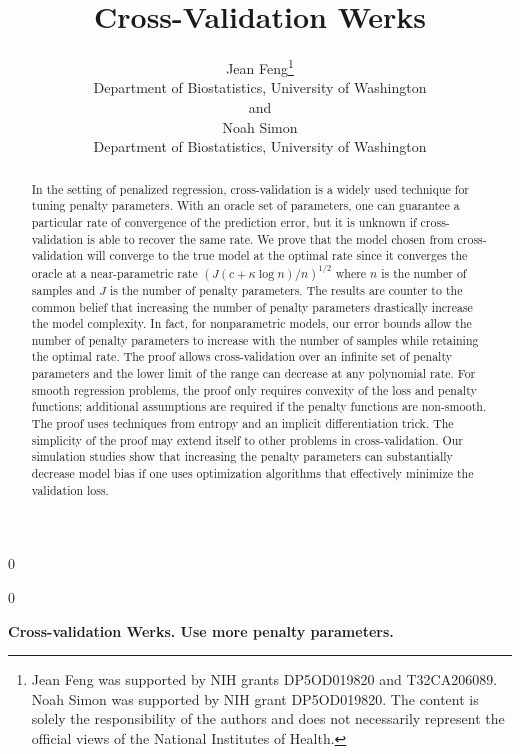 \documentclass[12pt]{article}
\newcommand{\blind}{0}
\begin{document}
%

\def\spacingset#1{\renewcommand{\baselinestretch}%
{#1}\small\normalsize} \spacingset{1}



\blind
{
  \title{\bf Cross-Validation Werks}
  \author{Jean Feng\thanks{
    Jean Feng was supported by NIH grants DP5OD019820 and T32CA206089.
    Noah Simon was supported by NIH grant DP5OD019820.
    The content is solely the responsibility of the authors and does not necessarily represent the official views of the National Institutes of Health.}\\
    Department of Biostatistics, University of Washington\\
    and \\
    Noah Simon \\
    Department of Biostatistics, University of Washington}
  \maketitle
} \fi

\blind
{
  \bigskip
  \bigskip
  \bigskip
  \begin{center}
    {\LARGE\bf Cross-validation Werks. Use more penalty parameters.}
\end{center}
  \medskip
} \fi

\bigskip
\begin{abstract}

In the setting of penalized regression, cross-validation is a widely used technique for tuning penalty parameters. With an oracle set of parameters, one can guarantee a particular rate of convergence of the prediction error, but it is unknown if cross-validation is able to recover the same rate. We prove that the model chosen from cross-validation will converge to the true model at the optimal rate since it converges the oracle at a near-parametric rate $(J (c + \kappa \log n)/n)^{1/2}$ where $n$ is the number of samples and $J$ is the number of penalty parameters. The results are counter to the common belief that increasing the number of penalty parameters drastically increase the model complexity. In fact, for nonparametric models, our error bounds allow the number of penalty parameters to increase with the number of samples while retaining the optimal rate. The proof allows cross-validation over an infinite set of penalty parameters and the lower limit of the range can decrease at any polynomial rate. For smooth regression problems, the proof only requires convexity of the loss and penalty functions; additional assumptions are required if the penalty functions are non-smooth. The proof uses techniques from entropy and an implicit differentiation trick. The simplicity of the proof may extend itself to other problems in cross-validation. Our simulation studies show that increasing the penalty parameters can substantially decrease model bias if one uses optimization algorithms that effectively minimize the validation loss.

\end{abstract}
\end{document}
